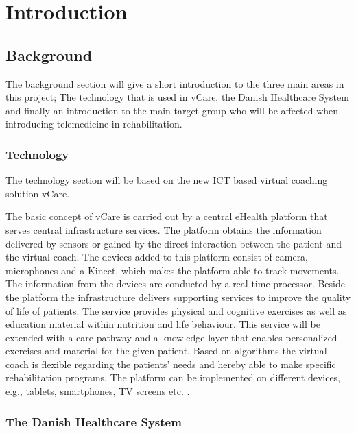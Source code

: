 \chapter{Introduction}

\section{Background}
The background section will give a short introduction to the three main areas in this project; The technology that is used in vCare, the Danish Healthcare System and finally an introduction to the main target group who will be affected when introducing telemedicine in rehabilitation. 

\subsection{Technology}

The technology section will be based on the new ICT based virtual coaching solution vCare. 

The basic concept of vCare is carried out by a central eHealth platform that serves central infrastructure services. The platform obtains the information delivered by sensors or gained by the direct interaction between the patient and the virtual coach. The devices added to this platform consist of camera, microphones and a Kinect, which makes the platform able to track movements. The information from the devices are conducted by a real-time processor. Beside the platform the infrastructure delivers supporting services to improve the quality of life of patients. The service provides physical and cognitive exercises as well as education material within nutrition and life behaviour. This service will be extended with a care pathway and a knowledge layer that enables personalized exercises and material for the given patient. Based on algorithms the virtual coach is flexible regarding the patients’ needs and hereby able to make specific rehabilitation programs. The platform can be implemented on different devices, e.g., tablets, smartphones, TV screens etc. \cite{Technical}. 


\subsection{The Danish Healthcare System}

